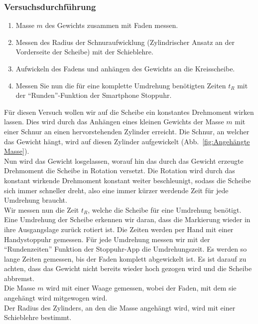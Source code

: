 \documentclass{article}
\begin{document}
	\subsubsection{Versuchsdurchführung}

	\begin{enumerate}
		\item Masse \(m\) des Gewichts zusammen mit Faden messen.
		\item Messen des Radius der Schnuraufwicklung (Zylindrischer Ansatz an der Vorderseite der Scheibe) mit der Schieblehre.
		\item Aufwickeln des Fadens und anhängen des Gewichts an die Kreisscheibe.
		\item Messen Sie nun die für eine komplette Umdrehung benötigten Zeiten \(t_R\) mit der \enquote{Runden}-Funktion der Smartphone Stoppuhr.
	\end{enumerate}
	
	Für diesen Versuch wollen wir auf die Scheibe ein konstantes Drehmoment wirken lassen.
	Dies wird durch das Anhängen eines kleinen Gewichts der Masse \(m\) mit einer Schnur an einen hervorstehenden Zylinder erreicht.
	Die Schnur, an welcher das Gewicht hängt, wird auf diesen Zylinder aufgewickelt (Abb.~\ref{fig:Angehängte Masse}). \\
	Nun wird das Gewicht losgelassen, worauf hin das durch das Gewicht erzeugte Drehmoment die Scheibe in Rotation versetzt.
	Die Rotation wird durch das konstant wirkende Drehmoment konstant weiter beschleunigt, sodass die Scheibe sich immer schneller dreht, also eine immer kürzer werdende Zeit für jede Umdrehung braucht. \\
	Wir messen nun die Zeit \(t_R\), welche die Scheibe für eine Umdrehung benötigt.
	Eine Umdrehung der Scheibe erkennen wir daran, dass die Markierung wieder in ihre Ausgangslage zurück rotiert ist.
	Die Zeiten werden per Hand mit einer Handystoppuhr gemessen. Für jede Umdrehung messen wir mit der \enquote{Rundenzeiten} Funktion der Stoppuhr-App die Umdrehungszeit.
	Es werden so lange Zeiten gemessen, bis der Faden komplett abgewickelt ist. Es ist darauf zu achten, dass das Gewicht nicht bereits wieder hoch gezogen wird und die Scheibe abbremst. \\
	Die Masse \(m\) wird mit einer Waage gemessen, wobei der Faden, mit dem sie angehängt wird mitgewogen wird. \\
	Der Radius des Zylinders, an den die Masse angehängt wird, wird mit einer Schieblehre bestimmt.
\end{document}
